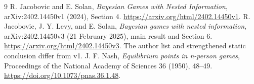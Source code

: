\documentclass[11pt]{article}
\theoremstyle{remark}\newtheorem{remark}[theorem]{Remark}
\begin{document}
\begin{thebibliography}{9}
 R. Jacobovic and E. Solan, \emph{Bayesian Games with Nested Information}, arXiv:2402.14450v1 (2024), Section 4. \url{https://arxiv.org/html/2402.14450v1}.
 R. Jacobovic, J. Y. Levy, and E. Solan, \emph{Bayesian games with nested information}, arXiv:2402.14450v3 (21 February 2025), main result and Section 6. \url{https://arxiv.org/html/2402.14450v3}. The author list and strengthened static conclusion differ from v1.
 J. F. Nash, \emph{Equilibrium points in n-person games}, Proceedings of the National Academy of Sciences 36 (1950), 48--49. \url{https://doi.org/10.1073/pnas.36.1.48}.
\end{thebibliography}
\end{document}
